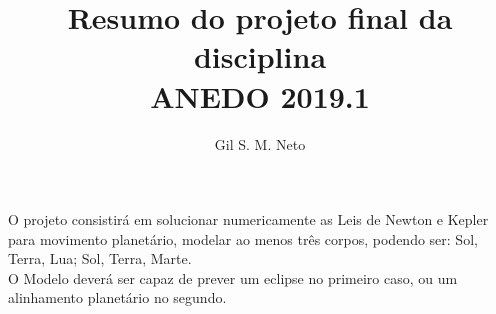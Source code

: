 \documentclass[12pt]{article}
\title{Resumo do projeto final da disciplina\\ANEDO 2019.1}
\author{Gil S. M. Neto}
\date{}
\begin{document}
\maketitle

O projeto consistirá em solucionar numericamente as Leis de Newton e Kepler para movimento planetário, modelar ao menos três corpos, podendo ser: Sol, Terra, Lua; Sol, Terra, Marte.\\
O Modelo deverá ser capaz de prever um eclipse no primeiro caso, ou um alinhamento planetário no segundo.
\end{document}
